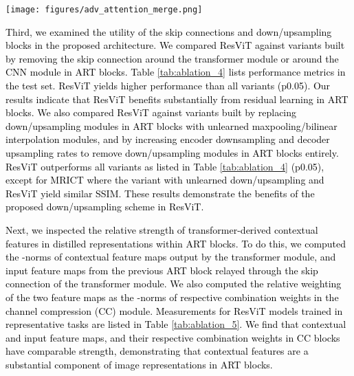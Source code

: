\documentclass[journal,twoside,web]{ieeecolor}
\newcommand{\ToneTtwoPD}{T\textsubscript{1},~T\textsubscript{2}~~PD}
\newcommand{\TtwoFlairTone}{T\textsubscript{2},~FLAIR~~T\textsubscript{1}}
\newcommand{\ToneFlairTtwo}{T\textsubscript{1},~FLAIR~~T\textsubscript{2}}
\newcommand{\ToneTtwoFlair}{T\textsubscript{1},~T\textsubscript{2}~~FLAIR}
\newcommand*{\revhl}{\textcolor{black}}
\begin{document}
\begin{figure*}[t]
\centering
\texttt{[image: figures/adv\_attention\_merge.png]}
\captionsetup{justification=justified,singlelinecheck=false}
\caption{\revhl{a) ResViT was compared against a variant where the adversarial term was removed from the loss function. Representative results are shown for \ToneTtwoPD ~in IXI, \ToneTtwoFlair ~in BRATS, and MRI  CT in the pelvic dataset. Adversarial loss improves the acuity of synthesized images. b) Representative results from ResViT and pGAN are shown along with the reference images for \TtwoFlairTone, \ToneFlairTtwo, and \ToneTtwoFlair ~in BRATS; and MRI  CT in the pelvic dataset. Error maps between the synthetic and reference images for each method are displayed, along with the attention map for the first transformer module of ResViT. Here, the attention maps were overlaid onto the reference image for improved visualization. Attention maps focus on image regions where ResViT substantially reduces synthesis errors compared to pGAN.
}}
\label{fig:adv_attention_merge}
\vspace{-11mm}
\end{figure*}

\revhl{Third, we examined the utility of the skip connections and down/upsampling blocks in the proposed architecture. We compared ResViT against variants built by removing the skip connection around the transformer module or around the CNN module in ART blocks. Table \ref{tab:ablation_4} lists performance metrics in the test set. ResViT yields higher performance than all variants (p0.05). Our results indicate that ResViT benefits substantially from residual learning in ART blocks. We also compared ResViT against variants built by replacing down/upsampling modules in ART blocks with unlearned maxpooling/bilinear interpolation modules, and by increasing encoder downsampling and decoder upsampling rates to remove down/upsampling modules in ART blocks entirely. ResViT outperforms all variants as listed in Table \ref{tab:ablation_4} (p0.05), except for MRICT where the variant with unlearned down/upsampling and ResViT yield similar SSIM. These results demonstrate the benefits of the proposed down/upsampling scheme in ResViT.}    



\revhl{Next, we inspected the relative strength of transformer-derived contextual features in distilled representations within ART blocks. To do this, we computed the -norms of contextual feature maps output by the transformer module, and input feature maps from the previous ART block relayed through the skip connection of the transformer module. We also computed the relative weighting of the two feature maps as the -norms of respective combination weights in the channel compression (CC) module. Measurements for ResViT models trained in representative tasks are listed in Table \ref{tab:ablation_5}. We find that contextual and input feature maps, and their respective combination weights in CC blocks have comparable strength, demonstrating that contextual features are a substantial component of image representations in ART blocks.}
\end{document}
